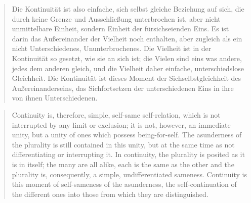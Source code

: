 \documentclass{article}
\begin{document}
\begin{quote}
    Die Kontinuität ist also einfache, sich selbst gleiche Beziehung auf sich, die durch keine Grenze
und Ausschließung unterbrochen ist, aber nicht unmittelbare Einheit, sondern Einheit der fürsichseienden
Eins. Es ist darin das Außereinander der Vielheit noch enthalten, aber zugleich als ein nicht Unterschiedenes,
Ununterbrochenes. Die Vielheit ist in der Kontinuität so gesetzt, wie sie an sich ist; die Vielen sind
eins was andere, jedes dem anderen gleich, und die Vielheit daher einfache, unterschiedslose Gleichheit.
Die Kontinuität ist dieses Moment der Sichselbstgleichheit des Außereinanderseins, das Sichfortsetzen
der unterschiedenen Eins in ihre von ihnen Unterschiedenen.
\end{quote}

\begin{quote}
    Continuity is, therefore, simple, self-same self-relation, which is not interrupted by any limit or
exclusion; it is not, however, an immediate unity, but a unity of ones which possess being-for-self. The
asunderness of the plurality is still contained in this unity, but at the same time as not differentiating
or interrupting it. In continuity, the plurality is posited as it is in itself; the many are all alike,
each is the same as the other and the plurality is, consequently, a simple, undifferentiated sameness.
Continuity is this moment of self-sameness of the asunderness, the self-continuation of the different
ones into those from which they are distinguished.
\end{quote}
\end{document}
